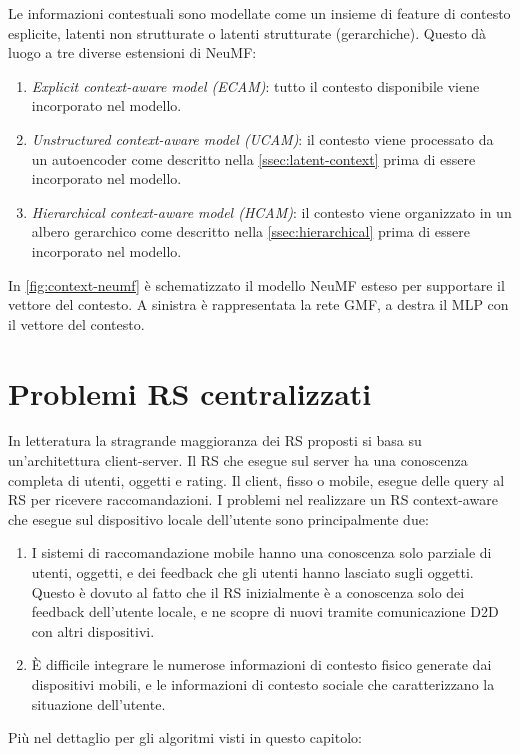 \documentclass[12pt,italian]{report}
\begin{document}
Le informazioni contestuali sono modellate come un insieme di feature di contesto esplicite, latenti non strutturate o latenti strutturate (gerarchiche). Questo dà luogo a tre diverse estensioni di NeuMF:
\begin{enumerate}
 \item \textit{Explicit context-aware model (ECAM)}: tutto il contesto disponibile viene incorporato nel modello.
 \item \textit{Unstructured context-aware model (UCAM)}: il contesto viene processato da un autoencoder \cite{latent-context} come descritto nella \autoref{ssec:latent-context} prima di essere incorporato nel modello.
 \item \textit{Hierarchical context-aware model (HCAM)}: il contesto viene organizzato in un albero gerarchico \cite{hierarchical-context} come descritto nella \autoref{ssec:hierarchical} prima di essere incorporato nel modello.
\end{enumerate}
In \autoref{fig:context-neumf} è schematizzato il modello NeuMF  esteso per supportare il vettore del contesto. A sinistra è rappresentata la rete GMF, a destra il MLP con il vettore del contesto.


\section{Problemi RS centralizzati} \label{sec:trad-rs-prob}
In letteratura la stragrande maggioranza dei RS proposti si basa su un'architettura client-server. Il RS che esegue sul server ha una conoscenza completa di utenti, oggetti e rating. Il client, fisso o mobile, esegue delle query al RS per ricevere raccomandazioni. I problemi nel realizzare un RS context-aware che esegue sul dispositivo locale dell'utente sono principalmente due:
\begin{enumerate}
 \item I sistemi di raccomandazione mobile hanno una conoscenza solo parziale di utenti, oggetti, e dei feedback che gli utenti hanno lasciato sugli oggetti. Questo è dovuto al fatto che il RS inizialmente è a conoscenza solo dei feedback dell'utente locale, e ne scopre di nuovi tramite comunicazione D2D con altri dispositivi. 
 
 \item \`E difficile integrare le numerose informazioni di contesto fisico generate dai dispositivi mobili, e le informazioni di contesto sociale che caratterizzano la situazione dell'utente.
\end{enumerate}
Più nel dettaglio per gli algoritmi visti in questo capitolo:
\end{document}
